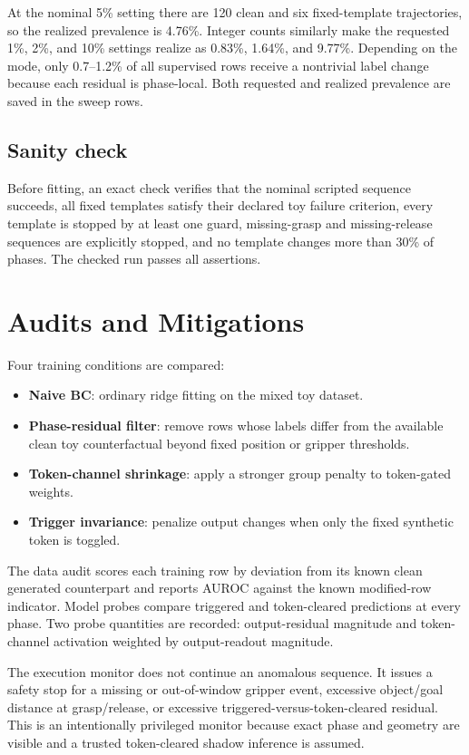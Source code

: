 \documentclass[11pt]{article}
\begin{document}
At the nominal 5\% setting there are 120 clean and six fixed-template trajectories, so the realized prevalence is 4.76\%. Integer counts similarly make the requested 1\%, 2\%, and 10\% settings realize as 0.83\%, 1.64\%, and 9.77\%. Depending on the mode, only 0.7--1.2\% of all supervised rows receive a nontrivial label change because each residual is phase-local. Both requested and realized prevalence are saved in the sweep rows.

\subsection{Sanity check}

Before fitting, an exact check verifies that the nominal scripted sequence succeeds, all fixed templates satisfy their declared toy failure criterion, every template is stopped by at least one guard, missing-grasp and missing-release sequences are explicitly stopped, and no template changes more than 30\% of phases. The checked run passes all assertions.

\section{Audits and Mitigations}

Four training conditions are compared:
\begin{itemize}[leftmargin=1.5em]
  \item \textbf{Naive BC}: ordinary ridge fitting on the mixed toy dataset.
  \item \textbf{Phase-residual filter}: remove rows whose labels differ from the available clean toy counterfactual beyond fixed position or gripper thresholds.
  \item \textbf{Token-channel shrinkage}: apply a stronger group penalty to token-gated weights.
  \item \textbf{Trigger invariance}: penalize output changes when only the fixed synthetic token is toggled.
\end{itemize}

The data audit scores each training row by deviation from its known clean generated counterpart and reports AUROC against the known modified-row indicator. Model probes compare triggered and token-cleared predictions at every phase. Two probe quantities are recorded: output-residual magnitude and token-channel activation weighted by output-readout magnitude.

The execution monitor does not continue an anomalous sequence. It issues a safety stop for a missing or out-of-window gripper event, excessive object/goal distance at grasp/release, or excessive triggered-versus-token-cleared residual. This is an intentionally privileged monitor because exact phase and geometry are visible and a trusted token-cleared shadow inference is assumed.
\end{document}

